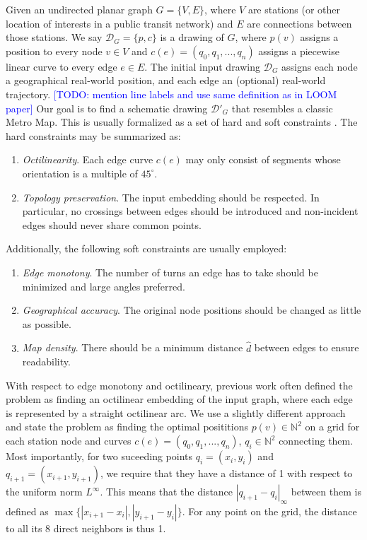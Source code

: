 \documentclass{sig-alternate-sigmod09}
\newcommand\TODO[1]{\textcolor{blue}{\small [TODO: #1]}}
\begin{document}
Given an undirected planar graph $G = \{V, E\}$, where $V$ are stations (or other location of interests in a public transit network) and $E$ are connections between those stations. We say $\mathcal{D}_G = \{p, c\}$ is a drawing of $G$, where $p(v)$ assigns a position to every node $v \in V$ and $c(e) = (q_0, q_1, ..., q_n)$ assigns a piecewise linear curve to every edge $e \in E$. The initial input drawing $\mathcal{D}_G$ assigns each node a geographical real-world position, and each edge an (optional) real-world trajectory.
\TODO{mention line labels and use same definition as in LOOM paper}
Our goal is to find a schematic drawing $\mathcal{D}'_G$ that resembles a classic Metro Map.
This is usually formalized as a set of hard and soft constraints \cite{nb, ...}.
The hard constraints may be summarized as:
\begin{enumerate}
\setlength\itemsep{.1em}
\item \emph{Octilinearity}. Each edge curve $c(e)$ may only consist of segments whose orientation is a multiple of $45^{\circ}$.
\item \emph{Topology preservation}. The input embedding should be respected. In particular, no crossings between edges should be introduced and non-incident edges should never share common points.
\end{enumerate}
Additionally, the following soft constraints are usually employed:
\begin{enumerate}
\setlength\itemsep{.1em}
\item \emph{Edge monotony}. The number of turns an edge has to take should be minimized and large angles preferred.
\item \emph{Geographical accuracy}. The original node positions should be changed as little as possible.
\item \emph{Map density}. There should be a minimum distance $\hat d$ between edges to ensure readability.
\end{enumerate}

With respect to edge monotony and octilineary, previous work often defined the problem as finding an octilinear embedding of the input graph, where each edge is represented by a straight octilinear arc.
We use a slightly different approach and state the problem as finding the optimal posititions $p(v) \in \mathbb{N}^2$ on a grid for each station node and curves $c(e) = (q_0, q_1, ..., q_n)$, $q_i \in \mathbb{N}^2$ connecting them. 
Most importantly, for two suceeding points $q_i = (x_i, y_i)$ and $q_{i+1} = (x_{i+1}, y_{i+1})$, we require that they have a distance of 1 with respect to the uniform norm $L^{\infty}$.
This means that the distance $|q_{i+1} - q_{i}|_{\infty}$ between them is defined as $\max \{|x_{i+1} - x_i|, |y_{i+1} - y_i|\}$.
For any point on the grid, the distance to all its 8 direct neighbors is thus 1.
\end{document}
